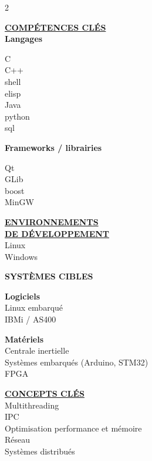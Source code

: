 \documentclass[11pt]{article}
\begin{document}
\begin{paracol}{2}
\switchcolumn[0]

\underline{\textbf{COMPÉTENCES CLÉS}}\\
\textbf{Langages}

C \\
C++ \\
shell \\
elisp \\
Java \\
python \\
sql

\vspace{3mm}

\textbf{Frameworks / librairies}

Qt \\
GLib \\
boost \\
MinGW

\vspace{3mm}

\underline{\textbf{ENVIRONNEMENTS}}\\
\underline{\textbf{DE DÉVELOPPEMENT}}\\
Linux \\
Windows

\vspace{3mm}

\textbf{SYSTÈMES CIBLES}

\textbf{Logiciels} \\
Linux embarqué \\
IBMi / AS400

\vspace{2mm}

\textbf{Matériels} \\
Centrale inertielle \\
Systèmes embarqués (Arduino, STM32) \\
FPGA

\vspace{3mm}

\underline{\textbf{CONCEPTS CLÉS}}\\
Multithreading \\
IPC \\
Optimisation performance et mémoire \\
Réseau \\
Systèmes distribués

\vspace{3mm}


\end{paracol}
\end{document}
